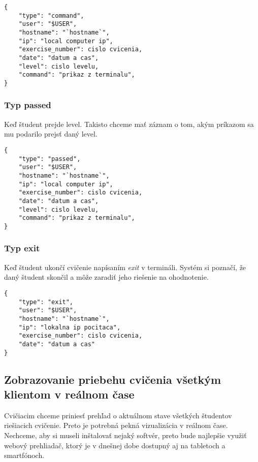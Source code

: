 \begin{lstlisting}
{
    "type": "command",
    "user": "$USER",
    "hostname": "`hostname`",
    "ip": "local computer ip",
    "exercise_number": cislo cvicenia,
    "date": "datum a cas",
    "level": cislo levelu,
    "command": "prikaz z terminalu",
}
\end{lstlisting}

\subsubsection{Typ passed}
\label{sec:apprequirements:gtadata:passed}

Keď študent prejde level. Takisto chceme mať záznam o tom, akým príkazom sa mu podarilo
prejsť daný level.

\begin{lstlisting}
{
    "type": "passed",
    "user": "$USER",
    "hostname": "`hostname`",
    "ip": "local computer ip",
    "exercise_number": cislo cvicenia,
    "date": "datum a cas",
    "level": cislo levelu,
    "command": "prikaz z terminalu",
}
\end{lstlisting}

\subsubsection{Typ exit}
\label{sec:apprequirements:gtadata:exit}

Keď študent ukončí cvičenie napísaním \textit{exit} v termináli.
Systém si poznačí, že daný študent skončil a môže zaradiť jeho riešenie
na ohodnotenie.

\begin{lstlisting}
{
    "type": "exit",
    "user": "$USER",
    "hostname": "`hostname`",
    "ip": "lokalna ip pocitaca",
    "exercise_number": cislo cvicenia,
    "date": "datum a cas"
}
\end{lstlisting}

\subsection{Zobrazovanie priebehu cvičenia všetkým klientom v reálnom čase}
\label{sec:apprequirements:visualization}

Cvičiacim chceme priniesť prehľad o aktuálnom stave všetkých študentov riešiacich
cvičenie. Preto je potrebná pekná vizualizácia v reálnom čase.
Nechceme, aby si museli inštalovať nejaký softvér, preto bude najlepšie využiť webový prehliadač, ktorý je v dnešnej dobe dostupný aj na tabletoch a smartfónoch.

